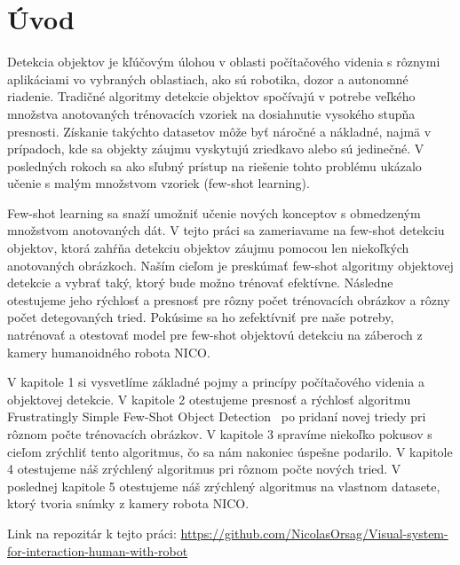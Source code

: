 \chapter*{Úvod}\label{chap:intro}
Detekcia objektov je kľúčovým úlohou v oblasti počítačového videnia s rôznymi aplikáciami vo vybraných oblastiach, ako sú robotika, dozor a autonomné riadenie. Tradičné algoritmy detekcie objektov spočívajú v potrebe veľkého množstva anotovaných trénovacích vzoriek na dosiahnutie vysokého stupňa presnosti. Získanie takýchto datasetov môže byť náročné a nákladné, najmä v prípadoch, kde sa objekty záujmu vyskytujú zriedkavo alebo sú jedinečné. V posledných rokoch sa ako sľubný prístup na riešenie tohto problému ukázalo učenie s malým množstvom vzoriek (few-shot learning).

Few-shot learning sa snaží umožniť učenie nových konceptov s obmedzeným množstvom anotovaných dát. V tejto práci sa zameriavame na few-shot detekciu objektov, ktorá zahŕňa detekciu objektov záujmu pomocou len niekoľkých anotovaných obrázkoch. Naším cieľom je preskúmať few-shot algoritmy objektovej detekcie a vybrať taký, ktorý bude možno trénovať efektívne. Následne otestujeme jeho rýchlosť a presnosť pre rôzny počet trénovacích obrázkov a rôzny počet detegovaných tried. Pokúsime sa ho zefektívniť pre naše potreby, natrénovať a otestovať model pre few-shot objektovú detekciu na záberoch z kamery humanoidného robota NICO. 

V kapitole 1 si vysvetlíme základné pojmy a princípy počítačového videnia a objektovej detekcie. V kapitole 2 otestujeme presnosť a rýchlosť algoritmu Frustratingly Simple Few-Shot Object Detection~\cite{FSFSODT} po pridaní novej triedy pri rôznom počte trénovacích obrázkov. V kapitole 3 spravíme niekoľko pokusov s cieľom zrýchliť tento algoritmus, čo sa nám nakoniec úspešne podarilo. V kapitole 4 otestujeme náš zrýchlený algoritmus pri rôznom počte nových tried. V poslednej kapitole 5 otestujeme náš zrýchlený algoritmus na vlastnom datasete, ktorý tvoria snímky z kamery robota NICO. 

Link na repozitár k tejto práci: \href{https://github.com/NicolasOrsag/Visual-system-for-interaction-human-with-robot}{https://github.com/NicolasOrsag/Visual-system-for-interaction-human-with-robot}

